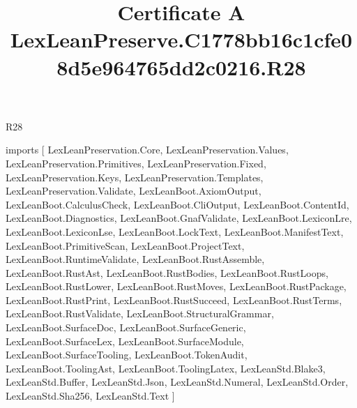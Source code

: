 \begin{lexlean}{R28}
\title{Certificate A LexLeanPreserve.C1778bb16c1cfe08d5e964765dd2c0216.R28}
\begin{coremodule}
imports [
  LexLeanPreservation.Core,
  LexLeanPreservation.Values,
  LexLeanPreservation.Primitives,
  LexLeanPreservation.Fixed,
  LexLeanPreservation.Keys,
  LexLeanPreservation.Templates,
  LexLeanPreservation.Validate,
  LexLeanBoot.AxiomOutput,
  LexLeanBoot.CalculusCheck,
  LexLeanBoot.CliOutput,
  LexLeanBoot.ContentId,
  LexLeanBoot.Diagnostics,
  LexLeanBoot.GnafValidate,
  LexLeanBoot.LexiconLre,
  LexLeanBoot.LexiconLse,
  LexLeanBoot.LockText,
  LexLeanBoot.ManifestText,
  LexLeanBoot.PrimitiveScan,
  LexLeanBoot.ProjectText,
  LexLeanBoot.RuntimeValidate,
  LexLeanBoot.RustAssemble,
  LexLeanBoot.RustAst,
  LexLeanBoot.RustBodies,
  LexLeanBoot.RustLoops,
  LexLeanBoot.RustLower,
  LexLeanBoot.RustMoves,
  LexLeanBoot.RustPackage,
  LexLeanBoot.RustPrint,
  LexLeanBoot.RustSucceed,
  LexLeanBoot.RustTerms,
  LexLeanBoot.RustValidate,
  LexLeanBoot.StructuralGrammar,
  LexLeanBoot.SurfaceDoc,
  LexLeanBoot.SurfaceGeneric,
  LexLeanBoot.SurfaceLex,
  LexLeanBoot.SurfaceModule,
  LexLeanBoot.SurfaceTooling,
  LexLeanBoot.TokenAudit,
  LexLeanBoot.ToolingAst,
  LexLeanBoot.ToolingLatex,
  LexLeanStd.Blake3,
  LexLeanStd.Buffer,
  LexLeanStd.Json,
  LexLeanStd.Numeral,
  LexLeanStd.Order,
  LexLeanStd.Sha256,
  LexLeanStd.Text
]


\end{coremodule}
\end{lexlean}
